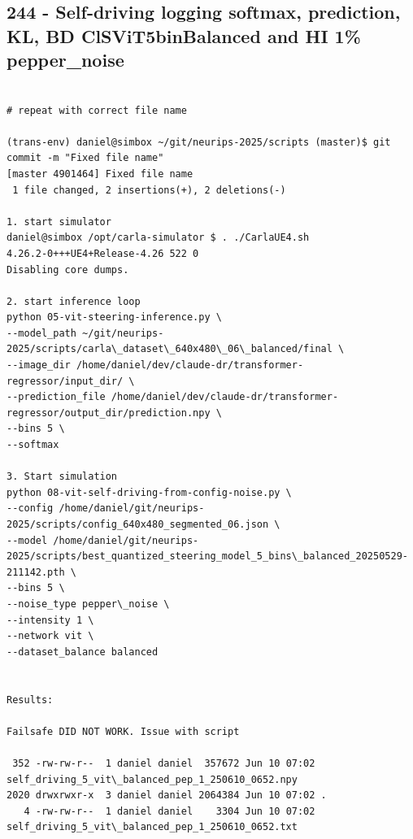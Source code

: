 \subsection{244 - Self-driving logging softmax, prediction, KL, BD ClSViT5binBalanced and HI 1\% pepper\_noise}
\label{app_res:244}

\begin{verbatim}

# repeat with correct file name

(trans-env) daniel@simbox ~/git/neurips-2025/scripts (master)$ git commit -m "Fixed file name"
[master 4901464] Fixed file name
 1 file changed, 2 insertions(+), 2 deletions(-)
 
1. start simulator
daniel@simbox /opt/carla-simulator $ . ./CarlaUE4.sh 
4.26.2-0+++UE4+Release-4.26 522 0
Disabling core dumps.

2. start inference loop
python 05-vit-steering-inference.py \
--model_path ~/git/neurips-2025/scripts/carla\_dataset\_640x480\_06\_balanced/final \
--image_dir /home/daniel/dev/claude-dr/transformer-regressor/input_dir/ \
--prediction_file /home/daniel/dev/claude-dr/transformer-regressor/output_dir/prediction.npy \
--bins 5 \
--softmax

3. Start simulation
python 08-vit-self-driving-from-config-noise.py \
--config /home/daniel/git/neurips-2025/scripts/config_640x480_segmented_06.json \
--model /home/daniel/git/neurips-2025/scripts/best_quantized_steering_model_5_bins\_balanced_20250529-211142.pth \
--bins 5 \
--noise_type pepper\_noise \
--intensity 1 \
--network vit \
--dataset_balance balanced


Results:

Failsafe DID NOT WORK. Issue with script

 352 -rw-rw-r--  1 daniel daniel  357672 Jun 10 07:02 self_driving_5_vit\_balanced_pep_1_250610_0652.npy
2020 drwxrwxr-x  3 daniel daniel 2064384 Jun 10 07:02 .
   4 -rw-rw-r--  1 daniel daniel    3304 Jun 10 07:02 self_driving_5_vit\_balanced_pep_1_250610_0652.txt

\end{verbatim}

